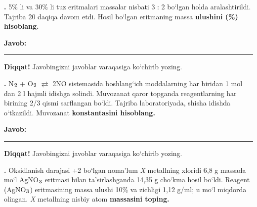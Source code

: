 \documentclass[11pt,a4paper]{article}
\renewcommand{\textsubscript}[1]{\ensuremath{_{\text{\fontsize{8}{8}\selectfont #1}}}}
\newcommand{\qn}[1]{\textbf{\fontsize{11.5}{13}\selectfont #1}}
\newcommand{\qsep}{\par\vspace{13pt}}
\newcommand{\javob}{\par\nopagebreak[4]\smallskip\noindent\textbf{Javob:} \rule[-2pt]{7.5cm}{0.4pt}\par\smallskip\noindent\textbf{Diqqat!} Javobingizni javoblar varaqasiga ko`chirib yozing.\par\medskip}
\begin{document}
\medskip
\noindent\setlength{\fboxsep}{0pt}
\par\bigskip
\noindent\qn{36.} 5\% li va 30\% li tuz eritmalari massalar nisbati 3 : 2 bo`lgan holda aralashtirildi. Tajriba 20 daqiqa davom etdi. Hosil bo`lgan eritmaning massa \textbf{ulushini (\%) hisoblang.}
\javob\qsep
\noindent\qn{37.} N\textsubscript{2} + O\textsubscript{2} $\rightleftarrows$ 2NO sistemasida boshlang`ich moddalarning har biridan 1 mol dan 2 l hajmli idishga solindi. Muvozanat qaror topganda reagentlarning har birining 2/3 qismi sarflangan bo`ldi. Tajriba laboratoriyada, shisha idishda o`tkazildi. Muvozanat \textbf{konstantasini hisoblang.}
\javob\qsep
\noindent\qn{38.} Oksidlanish darajasi +2 bo`lgan noma'lum \textit{X} metallning xloridi 6,8 g massada mo`l AgNO\textsubscript{3} eritmasi bilan ta'sirlashganda 14,35 g cho`kma hosil bo`ldi. Reagent (AgNO\textsubscript{3}) eritmasining massa ulushi 10\% va zichligi 1,12 g/ml; u mo`l miqdorda olingan. \textit{X} metallning nisbiy atom \textbf{massasini toping.}
\end{document}
